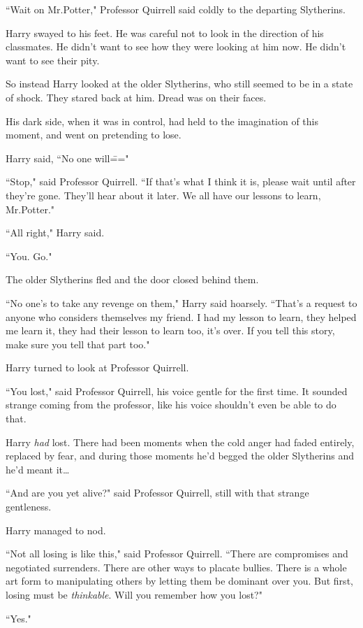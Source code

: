 ``Wait on Mr.\?Potter," Professor Quirrell said coldly to the departing Slytherins.

Harry swayed to his feet. He was careful not to look in the direction of his classmates. He didn't want to see how they were looking at him now. He didn't want to see their pity.

So instead Harry looked at the older Slytherins, who still seemed to be in a state of shock. They stared back at him. Dread was on their faces.

His dark side, when it was in control, had held to the imagination of this moment, and went on pretending to lose.

Harry said, ``No one will\==="

``Stop," said Professor Quirrell. ``If that's what I think it is, please wait until after they're gone. They'll hear about it later. We all have our lessons to learn, Mr.\?Potter."

``All right," Harry said.

``You. Go."

The older Slytherins fled and the door closed behind them.

``No one's to take any revenge on them," Harry said hoarsely. ``That's a request to anyone who considers themselves my friend. I had my lesson to learn, they helped me learn it, they had their lesson to learn too, it's over. If you tell this story, make sure you tell that part too."

Harry turned to look at Professor Quirrell.

``You lost," said Professor Quirrell, his voice gentle for the first time. It sounded strange coming from the professor, like his voice shouldn't even be able to do that.

Harry \emph{had} lost. There had been moments when the cold anger had faded entirely, replaced by fear, and during those moments he'd begged the older Slytherins and he'd meant it{\ldots}

``And are you yet alive?" said Professor Quirrell, still with that strange gentleness.

Harry managed to nod.

``Not all losing is like this," said Professor Quirrell. ``There are compromises and negotiated surrenders. There are other ways to placate bullies. There is a whole art form to manipulating others by letting them be dominant over you. But first, losing must be \emph{thinkable}. Will you remember how you lost?"

``Yes."

